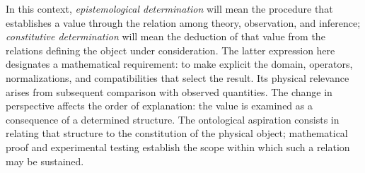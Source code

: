 In this context, \emph{epistemological determination} will mean
the procedure that establishes a value through the relation among theory,
observation, and inference; \emph{constitutive determination} will mean the
deduction of that value from the relations defining the object
under consideration. The latter expression here designates a mathematical requirement:
to make explicit the domain, operators, normalizations, and
compatibilities that select the result. Its physical relevance
arises from subsequent comparison with observed quantities.
The change in perspective affects the order of explanation: the value is
examined as a consequence of a determined structure. The ontological
aspiration consists in relating that structure to the constitution of the
physical object; mathematical proof and experimental testing establish
the scope within which such a relation may be sustained.
